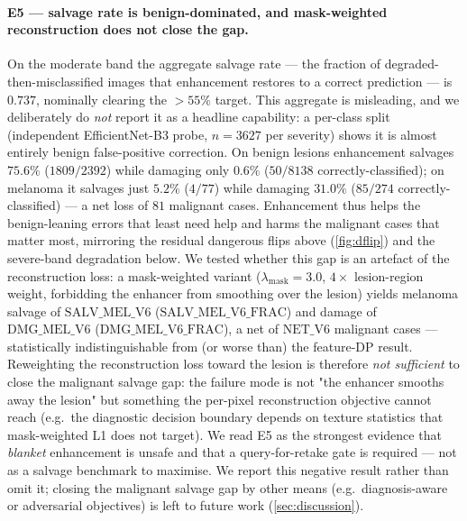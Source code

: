 \paragraph{E5 --- salvage rate is benign-dominated, and mask-weighted reconstruction does not
close the gap.}
On the moderate band the aggregate salvage rate --- the fraction of degraded-then-misclassified
images that enhancement restores to a correct prediction --- is $0.737$, nominally clearing the
$>55\%$ target. This aggregate is misleading, and we deliberately do \emph{not} report it as a
headline capability: a per-class split (independent EfficientNet-B3 probe, $n=3627$ per severity)
shows it is almost entirely benign false-positive correction. On benign lesions enhancement salvages
$75.6\%$ ($1809/2392$) while damaging only $0.6\%$ ($50/8138$ correctly-classified); on melanoma it
salvages just $5.2\%$ ($4/77$) while damaging $31.0\%$ ($85/274$ correctly-classified) --- a net loss
of $81$ malignant cases. Enhancement thus helps the benign-leaning errors that least need help and
harms the malignant cases that matter most, mirroring the residual dangerous flips above
(\cref{fig:dflip}) and the severe-band degradation below. We tested whether this gap is an
artefact of the reconstruction loss: a mask-weighted variant ($\lambda_{\text{mask}}=3.0$,
$4\times$ lesion-region weight, forbidding the enhancer from smoothing over the lesion) yields
melanoma salvage of $\mathrm{SALV\_MEL\_V6}$ ($\mathrm{SALV\_MEL\_V6\_FRAC}$) and damage of
$\mathrm{DMG\_MEL\_V6}$ ($\mathrm{DMG\_MEL\_V6\_FRAC}$), a net of $\mathrm{NET\_V6}$ malignant
cases --- statistically indistinguishable from (or worse than) the feature-DP result. Reweighting
the reconstruction loss toward the lesion is therefore \emph{not sufficient} to close the
malignant salvage gap: the failure mode is not "the enhancer smooths away the lesion" but
something the per-pixel reconstruction objective cannot reach (e.g.\ the diagnostic decision
boundary depends on texture statistics that mask-weighted L1 does not target). We read E5 as the
strongest evidence that \emph{blanket} enhancement is unsafe and that a query-for-retake gate is
required --- not as a salvage benchmark to maximise. We report this negative result rather than
omit it; closing the malignant salvage gap by other means (e.g.\ diagnosis-aware or
adversarial objectives) is left to future work (\cref{sec:discussion}).
